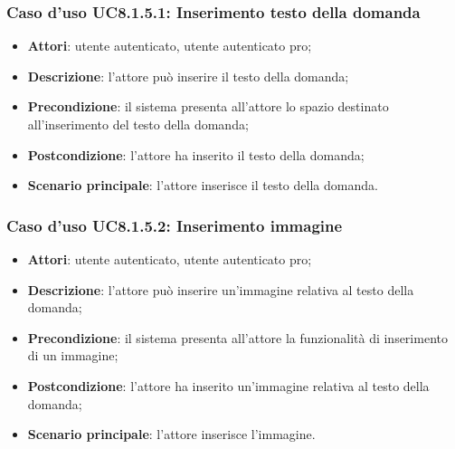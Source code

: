 \subsubsection{Caso d'uso UC8.1.5.1: Inserimento testo della domanda}
	\begin{itemize}
		\item
			\textbf{Attori}: utente autenticato, utente autenticato pro;
		\item		
			\textbf{Descrizione}: l'attore può inserire il testo della domanda;
		\item
			\textbf{Precondizione}: il sistema presenta all'attore lo spazio destinato all'inserimento del testo della domanda;
		\item
			\textbf{Postcondizione}: l'attore ha inserito il testo della domanda;
		\item
			\textbf{Scenario principale}: l'attore inserisce il testo della domanda. 
	 			
	\end{itemize}
	
\subsubsection{Caso d'uso UC8.1.5.2: Inserimento immagine}
	\begin{itemize}
		\item
			\textbf{Attori}: utente autenticato, utente autenticato pro;
		\item		
			\textbf{Descrizione}: l'attore può inserire un'immagine relativa al testo della domanda;
		\item
			\textbf{Precondizione}: il sistema presenta all'attore la funzionalità di inserimento di un immagine; 
		\item
			\textbf{Postcondizione}: l'attore ha inserito un'immagine relativa al testo della domanda;
		\item
			\textbf{Scenario principale}: l'attore inserisce l'immagine.						
	\end{itemize}


	
